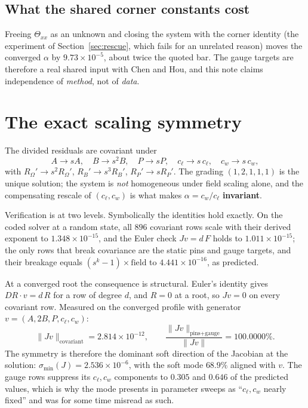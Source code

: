 \documentclass[11pt]{article}
\begin{document}
\subsection{What the shared corner constants cost}
\label{sec:cost}

Freeing $\Theta_{xx}$ as an unknown and closing the system with the corner identity (the
experiment of Section~\ref{sec:rescue}, which fails for an unrelated reason) moves the
converged $\alpha$ by $9.73\times10^{-5}$, about twice the quoted bar. The gauge targets
are therefore a real shared input with Chen and Hou, and this note claims independence of
\emph{method}, not of \emph{data}.

\section{The exact scaling symmetry}
\label{sec:symmetry}

The divided residuals are covariant under
\[
  A \to sA, \quad B \to s^2 B, \quad P \to sP, \quad c_\ell \to s\,c_\ell,
  \quad c_w \to s\,c_w,
\]
with $R_\Omega' \to s^2 R_\Omega'$, $R_B' \to s^3 R_B'$, $R_P' \to s R_P'$. The grading
$(1,2,1,1,1)$ is the unique solution; the system is \emph{not} homogeneous under field
scaling alone, and the compensating rescale of $(c_\ell, c_w)$ is what makes
$\alpha = c_w/c_\ell$ \textbf{invariant}.

Verification is at two levels. Symbolically the identities hold exactly. On the coded
solver at a random state, all $896$ covariant rows scale with their derived exponent to
$1.348\times10^{-15}$, and the Euler check $Jv = d\,F$ holds to $1.011\times10^{-15}$;
the only rows that break covariance are the static pins and gauge targets, and their
breakage equals $(s^k - 1)\times\text{field}$ to $4.441\times10^{-16}$, as predicted.

At a converged root the consequence is structural. Euler's identity gives
$DR\cdot v = d\,R$ for a row of degree $d$, and $R = 0$ at a root, so $Jv = 0$ on every
covariant row. Measured on the converged profile with generator
$v = (A, 2B, P, c_\ell, c_w)$:
\[
  \|Jv\|_{\text{covariant}} = 2.814\times10^{-12},
  \qquad
  \frac{\|Jv\|_{\text{pins+gauge}}}{\|Jv\|} = 100.0000\%.
\]
The symmetry is therefore the dominant soft direction of the Jacobian at the solution:
$\sigma_{\min}(J) = 2.536\times10^{-6}$, with the soft mode $68.9\%$ aligned with $v$.
The gauge rows suppress its $c_\ell, c_w$ components to $0.305$ and $0.646$ of the
predicted values, which is why the mode presents in parameter sweeps as
``$c_\ell, c_w$ nearly fixed'' and was for some time misread as such.
\end{document}
